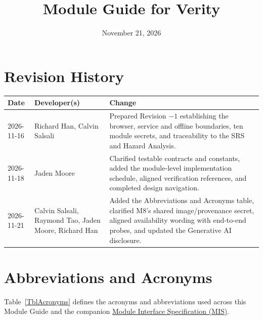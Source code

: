 \documentclass[12pt, titlepage]{article}
\newcommand{\repo}{https://github.com/richy1337/Verity}
\newcommand{\pdfbase}{\repo/blob/main/pdfs}
\begin{document}
\title{Module Guide for Verity}
\author{\authname}
\date{November 21, 2026}

\maketitle


\section{Revision History}

\begin{tabularx}{\textwidth}{p{2.3cm}p{3.2cm}X}
\toprule {\bf Date} & {\bf Developer(s)} & {\bf Change}\\
\midrule
2026-11-16 & Richard Han, Calvin Salsali & Prepared Revision $-1$ establishing the browser, service and offline boundaries, ten module secrets, and traceability to the SRS and Hazard Analysis.\\
2026-11-18 & Jaden Moore & Clarified testable contracts and constants, added the module-level implementation schedule, aligned verification references, and completed design navigation.\\
2026-11-21 & Calvin Salsali, Raymond Tao, Jaden Moore, Richard Han & Added the Abbreviations and Acronyms table, clarified M8's shared image/provenance secret, aligned availability wording with end-to-end probes, and updated the Generative AI disclosure.\\
\bottomrule
\end{tabularx}

\newpage

\tableofcontents

\listoftables

\listoffigures

\newpage


\section{Abbreviations and Acronyms}

Table~\ref{TblAcronyms} defines the acronyms and abbreviations used across this Module Guide and the companion \href{\pdfbase/Design/SoftDetailedDes/MIS.pdf}{Module Interface Specification (MIS)}.
\end{document}
